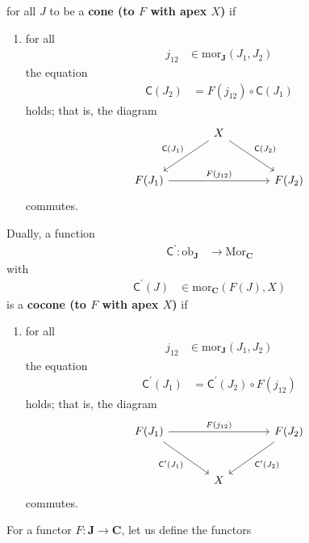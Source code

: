 for all $J$ to be a \textbf{cone (to $F$ with apex $X$)} if
\begin{enumerate}
\item[($\blacktriangle$)]
for all
\begin{align*}
  j_{12}
  &\in
  \mathrm{mor}_{\mathbf{J}}(J_{1},J_{2})
\end{align*}
the equation
\begin{align*}
  \mathsf{C}(J_{2})
  &=
  F(j_{12})
  \circ
  \mathsf{C}(J_{1})
\end{align*}
holds; that is, the diagram
\[
\begin{tikzcd}[sep=large]
  &
  X
  \arrow{dr}{\mathsf{C}(J_{2})}
  \arrow[swap]{dl}{\mathsf{C}(J_{1})}
  &
  \\
  F(J_{1})
  \arrow{rr}{F(j_{12})}
  &
  &
  F(J_{2})
\end{tikzcd}
\]
commutes.
\end{enumerate}
Dually, a function
\begin{align*}
  \mathsf{C}^{\prime}
  \colon
  \mathrm{ob}_{\mathbf{J}}
  &\rightarrow
  \mathrm{Mor}_{\mathbf{C}}
\end{align*}
with
\begin{align*}
  \mathsf{C}^{\prime}(J)
  &\in
  \mathrm{mor}_{\mathbf{C}}(F(J),X)
\end{align*}
is a \textbf{cocone (to $F$ with apex $X$)} if
\begin{enumerate}
\item[($\blacktriangle^{\prime}$)]
for all
\begin{align*}
  j_{12}
  &\in
  \mathrm{mor}_{\mathbf{J}}(J_{1},J_{2})
\end{align*}
the equation
\begin{align*}
  \mathsf{C}^{\prime}(J_{1})
  &=
  \mathsf{C}^{\prime}(J_{2})
  \circ
  F(j_{12})
\end{align*}
holds; that is, the diagram
\[
\begin{tikzcd}[sep=large]
  F(J_{1})
  \arrow{rr}{F(j_{12})}
  \arrow[swap]{dr}{\mathsf{C}^{\prime}(J_{1})}
  &
  &
  F(J_{2})
  \arrow{dl}{\mathsf{C}^{\prime}(J_{2})}
  \\
  &
  X
  &
\end{tikzcd}
\]
commutes.
\end{enumerate}
For a functor $F \colon \mathbf{J} \rightarrow \mathbf{C}$, let us define the functors
